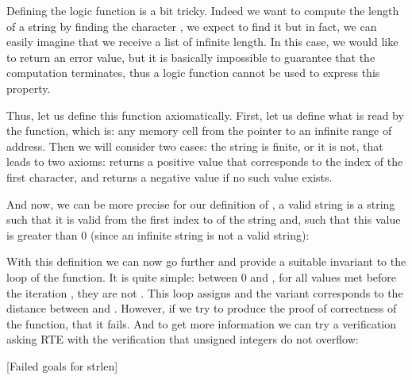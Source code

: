 


Defining the logic function  is a bit tricky. Indeed
we want to compute the length of a string by finding the character
, we expect to find it but in fact, we
can easily imagine that we receive a list of infinite length. In this case,
we would like to return an error value, but it is basically impossible to
guarantee that the computation terminates, thus a logic function cannot
be used to express this property.



Thus, let us define this function axiomatically. First, let us define what
is read by the function, which is: any memory cell from the pointer to an
infinite range of address. Then we will consider two cases: the string is
finite, or it is not, that leads to two axioms:  returns
a positive value that corresponds to the index of the first
 character, and returns a negative value if
no such value exists.






And now, we can be more precise for our definition of
, a valid string is a
string such that it is valid from the first index to 
of the string and, such that this value is greater than 0 (since an
infinite string is not a valid string):








With this definition we can now go further and provide a suitable
invariant to the loop of the  function. It is quite
simple:  between 0 and , for
all values met before the iteration , they are not
. This loop assigns  and
the variant corresponds to the distance between  and
. However, if we try to produce the proof of
correctness of the function, that it fails. And to get more information
we can try a verification asking RTE with the verification that unsigned
integers do not overflow:




[Failed goals for strlen]



